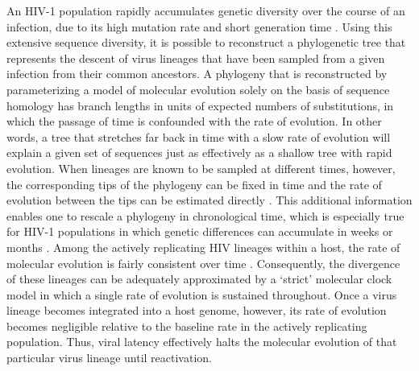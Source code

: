 \documentclass[12pt]{article}
\begin{document}
An HIV-1 population rapidly accumulates genetic diversity over the course of an infection, due to its high mutation rate and short generation time %
\citep{Alizon13, Shankarappa99, Rambaut04}. 
Using this extensive sequence diversity, it is possible to reconstruct a phylogenetic tree that represents the descent of virus lineages that have been sampled from a given infection from their common ancestors. 
A phylogeny that is reconstructed by parameterizing a model of molecular evolution \cite[\textit{e.g.}, by maximum likelihood estimation;][]{Felsenstein:1981} solely on the basis of sequence homology has branch lengths in units of expected numbers of substitutions, in which the passage of time is confounded with the rate of evolution.
In other words, a tree that stretches far back in time with a slow rate of evolution will explain a given set of sequences just as effectively as a shallow tree with rapid evolution.  
When lineages are known to be sampled at different times, however, the corresponding tips of the phylogeny can be fixed in time and the rate of evolution between the tips can be estimated directly \citep{Rodrigo99}.
This additional information enables one to rescale a phylogeny in chronological time, which is especially true for HIV-1 populations in which genetic differences can accumulate in weeks or months \citep{Williamson:2003}.
Among the actively replicating HIV lineages within a host, the rate of molecular evolution is fairly consistent over time \citep{Leitner99, Kuhner95, Korber00}.
Consequently, the divergence of these lineages can be adequately approximated by a `strict' molecular clock model in which a single rate of evolution is sustained throughout.
Once a virus lineage becomes integrated into a host genome, however, its rate of evolution becomes negligible relative to the baseline rate in the actively replicating population.
Thus, viral latency effectively halts the molecular evolution of that particular virus lineage until reactivation. 

\end{document}
